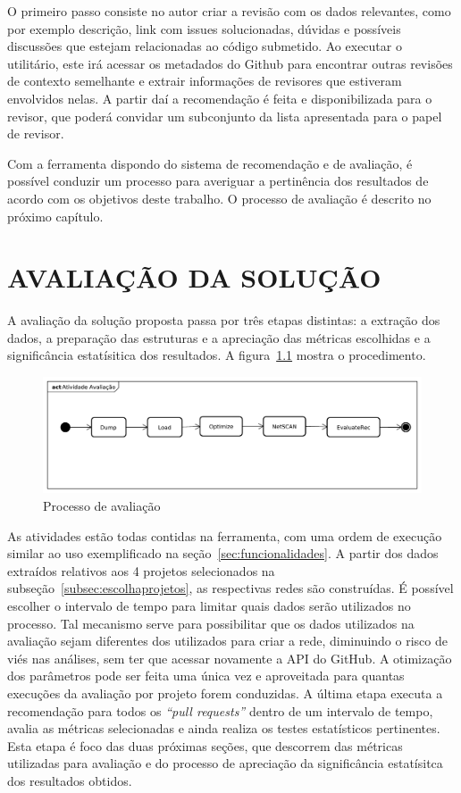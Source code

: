\documentclass[12pt,openany,oneside,a4paper,english,brazil]{abntbibufjf}
\begin{document}
  O primeiro passo consiste no autor criar a revisão com os dados relevantes, como por exemplo descrição, link com issues solucionadas, dúvidas e possíveis discussões que estejam relacionadas ao código submetido. Ao executar o utilitário, este irá acessar os metadados do Github para encontrar outras revisões de contexto semelhante e extrair informações de revisores que estiveram envolvidos nelas. A partir daí a recomendação é feita e disponibilizada para o revisor, que poderá convidar um subconjunto da lista apresentada para o papel de revisor.

  Com a ferramenta dispondo do sistema de recomendação e de avaliação, é possível conduzir um processo para averiguar a pertinência dos resultados  de acordo com os objetivos deste trabalho. O processo de avaliação é descrito no próximo capítulo.

\chapter{AVALIAÇÃO DA SOLUÇÃO}\label{chap:resultados}
    A avaliação da solução proposta passa por três etapas distintas: a extração dos dados, a preparação das estruturas e a apreciação das métricas escolhidas e a significância estatísitica dos resultados. A figura~\ref{fig:avaliacao} mostra o procedimento.

     \begin{figure}[!htbp]
       \includegraphics[width=\textwidth]{avaliacao}
      \caption{Processo de avaliação}\label{fig:avaliacao}
    \end{figure}

    As atividades estão todas contidas na ferramenta, com uma ordem de execução similar ao uso exemplificado na seção~\ref{sec:funcionalidades}. A partir dos dados extraídos relativos aos 4 projetos selecionados na subseção~\ref{subsec:escolhaprojetos}, as respectivas redes são construídas. É possível escolher o intervalo de tempo para limitar quais dados serão utilizados no processo. Tal mecanismo serve para possibilitar que os dados utilizados na avaliação sejam diferentes dos utilizados para criar a rede, diminuindo o risco de viés nas análises, sem ter que acessar novamente a API do GitHub. A otimização dos parâmetros pode ser feita uma única vez e aproveitada para quantas execuções da avaliação por projeto forem conduzidas. A última etapa executa a recomendação para todos os \textit{``pull requests''} dentro de um intervalo de tempo, avalia as métricas selecionadas e ainda realiza os testes estatísticos pertinentes. Esta etapa é foco das duas próximas seções, que descorrem das métricas utilizadas para avaliação e do processo de apreciação da significância estatísitca dos resultados obtidos.
\end{document}
